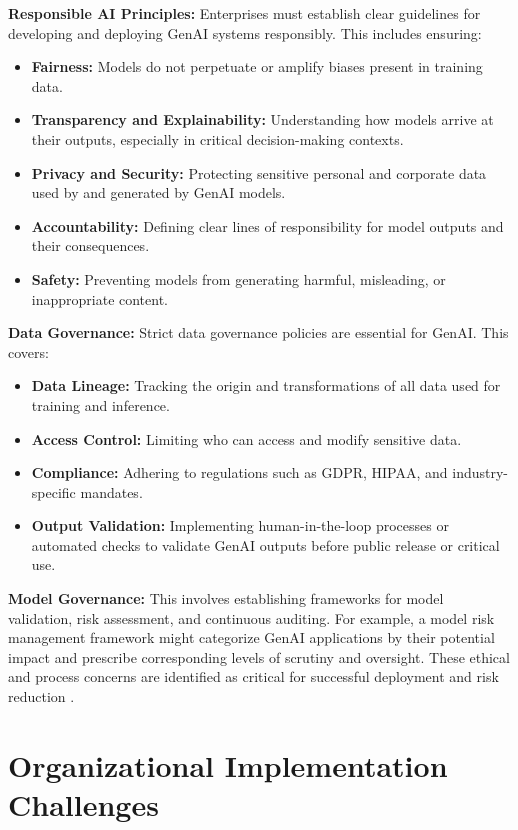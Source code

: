 \documentclass[10pt,twocolumn,letterpaper]{article}
\begin{document}
\textbf{Responsible AI Principles:} Enterprises must establish clear guidelines for developing and deploying GenAI systems responsibly. This includes ensuring:
\begin{itemize}
  \item \textbf{Fairness:} Models do not perpetuate or amplify biases present in training data.
  \item \textbf{Transparency and Explainability:} Understanding how models arrive at their outputs, especially in critical decision-making contexts.
  \item \textbf{Privacy and Security:} Protecting sensitive personal and corporate data used by and generated by GenAI models.
  \item \textbf{Accountability:} Defining clear lines of responsibility for model outputs and their consequences.
  \item \textbf{Safety:} Preventing models from generating harmful, misleading, or inappropriate content.
\end{itemize}

\textbf{Data Governance:} Strict data governance policies are essential for GenAI. This covers:
\begin{itemize}
  \item \textbf{Data Lineage:} Tracking the origin and transformations of all data used for training and inference.
  \item \textbf{Access Control:} Limiting who can access and modify sensitive data.
  \item \textbf{Compliance:} Adhering to regulations such as GDPR, HIPAA, and industry-specific mandates.
  \item \textbf{Output Validation:} Implementing human-in-the-loop processes or automated checks to validate GenAI outputs before public release or critical use.
\end{itemize}

\textbf{Model Governance:} This involves establishing frameworks for model validation, risk assessment, and continuous auditing. For example, a model risk management framework might categorize GenAI applications by their potential impact and prescribe corresponding levels of scrutiny and oversight. These ethical and process concerns are identified as critical for successful deployment and risk reduction \cite{openalex_w4400993506}.


\section{Organizational Implementation Challenges}
\end{document}
